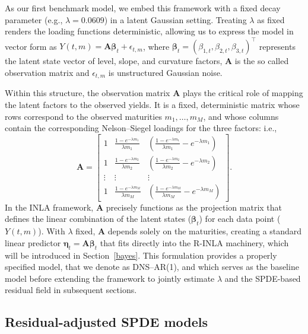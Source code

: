 \documentclass[
  12pt]{article}
\begin{document}
As our first benchmark model, we embed this framework with a fixed decay parameter (e.g., $\lambda=0.0609$) in a latent Gaussian setting. Treating $\lambda$ as fixed renders the loading functions deterministic, allowing us to express the model in vector form as $Y(t,m) = \boldsymbol{A} \boldsymbol{\beta}_t + \epsilon_{t,m}$, where $\boldsymbol{\beta}_t = (\beta_{1,t}, \beta_{2,t}, \beta_{3,t})^\top$ represents the latent state vector of level, slope, and curvature factors, $\boldsymbol{A}$ is the so called observation matrix and $\epsilon_{t,m}$ is unstructured Gaussian noise.

Within this structure, the observation matrix $\boldsymbol{A}$ plays the critical role of mapping the latent factors to the observed yields. It is a fixed, deterministic matrix whose rows correspond to the observed maturities $m_1, \dots, m_M$, and whose columns contain the corresponding Nelson--Siegel loadings for the three factors: i.e.,
\[
\boldsymbol{A} = 
\begin{bmatrix}
1 & \frac{1-e^{-\lambda m_1}}{\lambda m_1} & \left(\frac{1-e^{-\lambda m_1}}{\lambda m_1} - e^{-\lambda m_1}\right) \\
1 & \frac{1-e^{-\lambda m_2}}{\lambda m_2} & \left(\frac{1-e^{-\lambda m_2}}{\lambda m_2} - e^{-\lambda m_2}\right) \\
\vdots & \vdots & \vdots \\
1 & \frac{1-e^{-\lambda m_M}}{\lambda m_M} & \left(\frac{1-e^{-\lambda m_M}}{\lambda m_M} - e^{-\lambda m_M}\right)
\end{bmatrix}.
\]
In the INLA framework, $\boldsymbol{A}$ precisely functions as the projection matrix that defines the linear combination of the latent states ($\boldsymbol{\beta}_t$) for each data point ($Y(t,m)$). With $\lambda$ fixed, $\boldsymbol{A}$ depends solely on the maturities, creating a standard linear predictor $\boldsymbol{\eta}_t = \boldsymbol{A}\boldsymbol{\beta}_t$ that fits directly into the R-INLA machinery, which will be introduced in Section~\ref{bayes}. This formulation provides a properly specified model, that we denote as DNS–AR(1), and which serves as the baseline model before extending the framework to jointly estimate $\lambda$ and the SPDE-based residual field in subsequent sections.


\subsection{Residual-adjusted SPDE models}\label{models}
\end{document}
